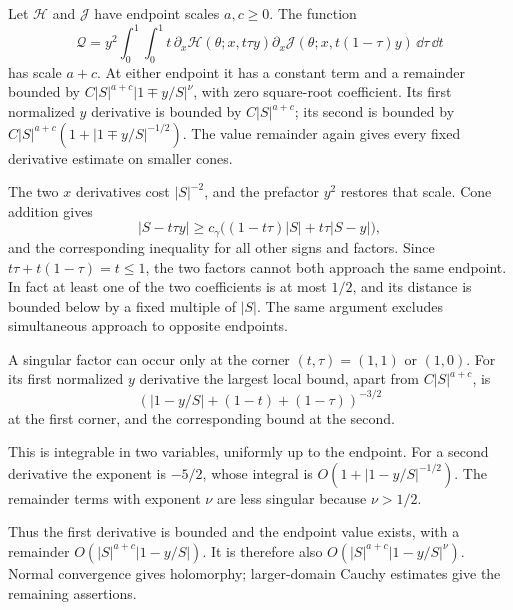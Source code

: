 \begin{lmm}\label{lmm:b:quadratic-endpoint}
Let $\mathcal H$ and $\mathcal J$ have endpoint scales $a,c\geq0$.
The function
\begin{equation}\label{eq:b:quadratic-input}
 \mathcal Q=y^2\int_0^1\int_0^1
 t\,\partial_x\mathcal H(\theta;x,t\tau y)
       \partial_x\mathcal J(\theta;x,t(1-\tau)y)
                              \,\dd\tau\,\dd t
\end{equation}
has scale $a+c$. At either endpoint it has a constant term and
a remainder bounded by $C|S|^{a+c}|1\mp y/S|^\nu$, with zero
square-root coefficient. Its first normalized $y$ derivative is
bounded by $C|S|^{a+c}$; its second is bounded by
$C|S|^{a+c}(1+|1\mp y/S|^{-1/2})$.
The value remainder again gives every fixed derivative estimate
on smaller cones.
\end{lmm}
\begin{prf}
The two $x$ derivatives cost $|S|^{-2}$, and the prefactor $y^2$
restores that scale. Cone addition gives
\[
 |S-t\tau y|\geq c_\gamma
       \bigl((1-t\tau)|S|+t\tau|S-y|\bigr),
\]
and the corresponding inequality for all other signs and factors.
Since $t\tau+t(1-\tau)=t\leq1$, the two factors cannot both
approach the same endpoint. In fact at least one of the two
coefficients is at most $1/2$, and its distance is bounded below
by a fixed multiple of $|S|$. The same argument excludes
simultaneous approach to opposite endpoints.

A singular factor can occur only at the corner $(t,\tau)=(1,1)$
or $(1,0)$. For its first normalized $y$ derivative the largest
local bound, apart from $C|S|^{a+c}$, is
\[
 (|1-y/S|+(1-t)+(1-\tau))^{-3/2}
\]
at the first corner, and the corresponding bound at the second.

This is integrable in two variables, uniformly up to the endpoint.
For a second derivative the exponent is $-5/2$, whose integral is
$O(1+|1-y/S|^{-1/2})$. The remainder terms with exponent $\nu$
are less singular because $\nu>1/2$.

Thus the first derivative
is bounded and the endpoint value exists, with a remainder
$O(|S|^{a+c}|1-y/S|)$. It is therefore also $O(|S|^{a+c}|1-y/S|^\nu)$.
Normal convergence gives holomorphy; larger-domain Cauchy estimates
give the remaining assertions.
\end{prf}

